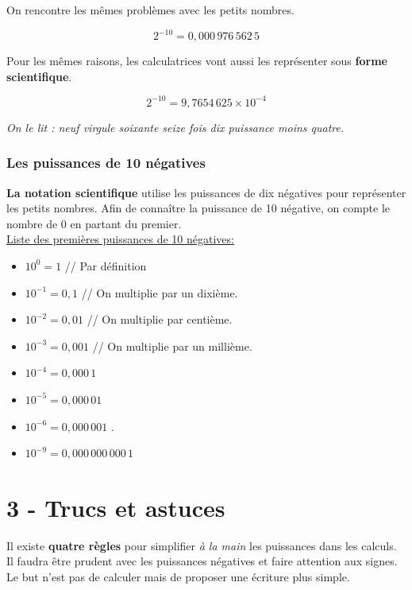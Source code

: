 \documentclass[12pt]{article}
\begin{document}
\begin{multicols}{2}

  On rencontre les mêmes problèmes avec les petits nombres.

  $$2^{-10} = 0, 000 \, 976\, 562\, 5$$

  Pour les mêmes raisons, les calculatrices vont aussi les représenter sous \textbf{forme scientifique}.

  $$2^{-10} = 9, 7654 \, 625 \times 10^{-4}$$

  \textit{On le lit : neuf virgule soixante seize fois dix puissance moins quatre.}

  \subsubsection*{Les puissances de 10 négatives}

  \textbf{La notation scientifique} utilise les puissances de dix négatives pour représenter les petits nombres. Afin de connaître la puissance de 10 négative, on compte le nombre de 0 en partant du premier. \\

  \underline{Liste des premières puissances de 10 négatives:} \\

  \begin{itemize}
  \item $10^0 = 1 $ // Par définition 
  \item $10^{-1} = 0,1$ // On multiplie par un dixième.
  \item $10^{-2} = 0,01$ // On multiplie par centième.
  \item $10^{-3} = 0,001$ // On multiplie par un millième.
  \item $10^{-4} = 0,000 \, 1$ 
  \item $10^{-5} = 0,000 \, 01$ 
  \item $10^{-6} = 0,000 \, 001$ .
  \item $10^{-9} = 0,000 \, 000 \, 000 \, 1$ 
  \end{itemize}
\end{multicols}

\newpage

\section*{3 - Trucs et astuces}

Il existe \textbf{quatre règles} pour simplifier \textit{à la main} les puissances dans les calculs. Il faudra être prudent avec les puissances négatives et faire attention aux signes. Le but n'est pas de calculer mais de proposer une écriture plus simple.
\end{document}
